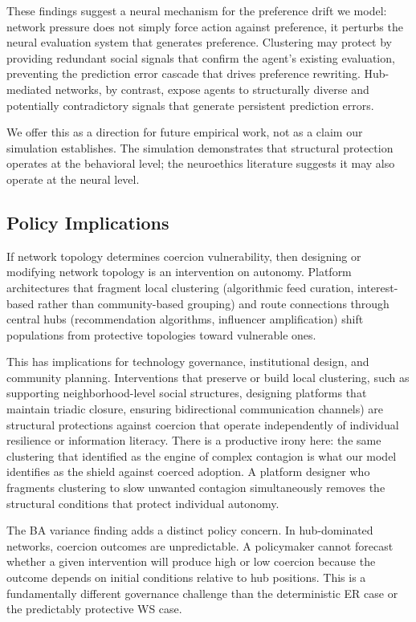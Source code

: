 \documentclass[11pt, a4paper]{article}
\begin{document}
These findings suggest a neural mechanism for the preference drift we model: network pressure does not simply force action against preference, it perturbs the neural evaluation system that generates preference. Clustering may protect by providing redundant social signals that confirm the agent's existing evaluation, preventing the prediction error cascade that drives preference rewriting. Hub-mediated networks, by contrast, expose agents to structurally diverse and potentially contradictory signals that generate persistent prediction errors.

We offer this as a direction for future empirical work, not as a claim our simulation establishes. The simulation demonstrates that structural protection operates at the behavioral level; the neuroethics literature suggests it may also operate at the neural level.

\subsection{Policy Implications}

If network topology determines coercion vulnerability, then designing or modifying network topology is an intervention on autonomy. Platform architectures that fragment local clustering (algorithmic feed curation, interest-based rather than community-based grouping) and route connections through central hubs (recommendation algorithms, influencer amplification) shift populations from protective topologies toward vulnerable ones.

This has implications for technology governance, institutional design, and community planning. Interventions that preserve or build local clustering, such as supporting neighborhood-level social structures, designing platforms that maintain triadic closure, ensuring bidirectional communication channels) are structural protections against coercion that operate independently of individual resilience or information literacy. There is a productive irony here: the same clustering that \citet{centola2018behavior} identified as the engine of complex contagion is what our model identifies as the shield against coerced adoption. A platform designer who fragments clustering to slow unwanted contagion simultaneously removes the structural conditions that protect individual autonomy.

The BA variance finding adds a distinct policy concern. In hub-dominated networks, coercion outcomes are unpredictable. A policymaker cannot forecast whether a given intervention will produce high or low coercion because the outcome depends on initial conditions relative to hub positions. This is a fundamentally different governance challenge than the deterministic ER case or the predictably protective WS case.
\end{document}
